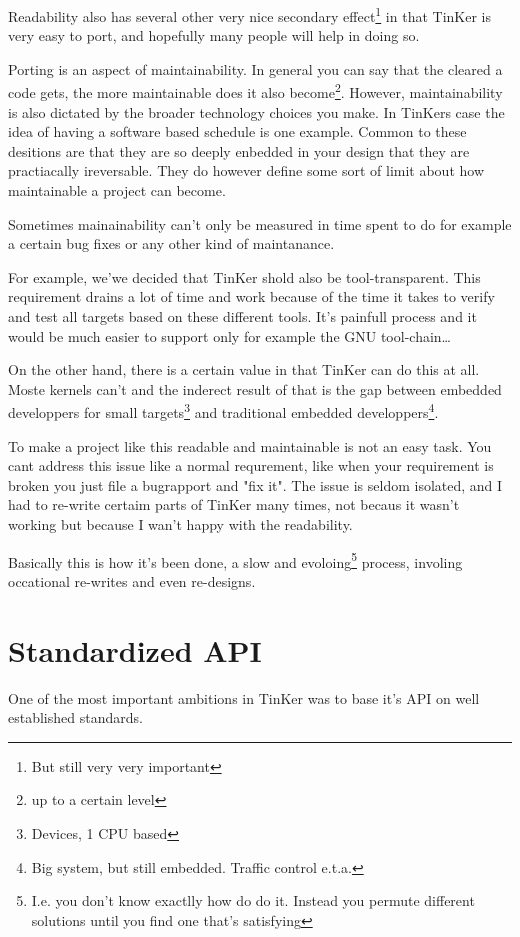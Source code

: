 Readability also has several other very nice secondary effect\footnote{But still very very important} in that TinKer is very easy to port, and hopefully many people will help in doing so.

Porting is an aspect of maintainability. In general you can say that the cleared a code gets, the more maintainable does it also become\footnote{up to a certain level}. However, maintainability is also dictated by the broader technology choices you make. In TinKers case the idea of having a software based schedule is one example. Common to these desitions are that they are so deeply enbedded in your design that they are practiacally ireversable. They do however define some sort of limit about how maintainable a project can become.

Sometimes mainainability can't only be measured in time spent to do for example a certain bug fixes or any other kind of maintanance.

For example, we'we decided that TinKer shold also be tool-transparent. This requirement drains a lot of time and work because of the time it takes to verify and test all targets based on these different tools. It's painfull process and it would be much easier to support only for example the GNU tool-chain\ldots

On the other hand, there is a certain value in that TinKer can do this at all. Moste kernels can't and the inderect result of that is the gap between embedded developpers for small targets\footnote{Devices, 1 CPU based} and traditional embedded developpers\footnote{Big system, but still embedded. Traffic control e.t.a.}.

To make a project like this readable and maintainable is not an easy task. You cant address this issue like a normal requrement, like when your requirement is broken you just file a bugrapport and "fix it". The issue is seldom isolated, and I had to re-write certaim parts of TinKer many times, not becaus it wasn't working but because I wan't happy with the readability.

Basically this is how it's been done, a slow and evoloing\footnote{I.e. you don't know exactlly how do do it. Instead you permute different solutions until you find one that's satisfying} process, involing occational re-writes and even re-designs.

\chapter{Standardized API}
One of the most important ambitions in TinKer was to base it's API on well established standards.

